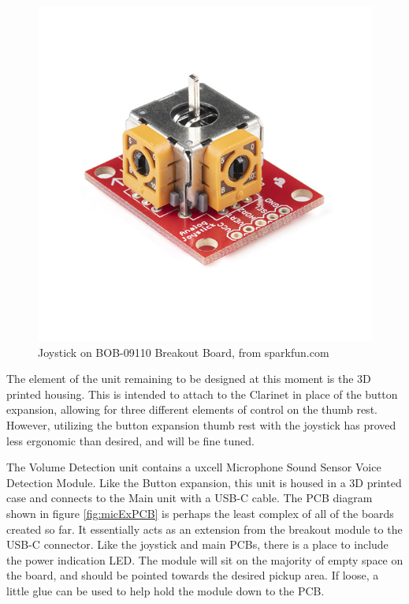 \begin{figure}
    \centering
    \includegraphics[scale=1.2]{diagrams/oem/16273-Thumb_Joystick_-_Deluxe-03.jpg}
    \caption{Joystick on BOB-09110 Breakout Board, from sparkfun.com}
    \label{fig:js2}
\end{figure}

The element of the unit remaining to be designed at this moment is the 3D printed housing. This is intended to attach to the Clarinet in place of the button expansion, allowing for three different elements of control on the thumb rest. However, utilizing the button expansion thumb rest with the joystick has proved less ergonomic than desired, and will be fine tuned.

The Volume Detection unit contains a uxcell Microphone Sound Sensor Voice Detection Module. Like the Button expansion, this unit is housed in a 3D printed case and connects to the Main unit with a USB-C cable. The PCB diagram shown in figure \ref{fig:micExPCB} is perhaps the least complex of all of the boards created so far. It essentially acts as an extension from the breakout module to the USB-C connector. Like the joystick and main PCBs, there is a place to include the power indication LED. The module will sit on the majority of empty space on the board, and should be pointed towards the desired pickup area. If loose, a little glue can be used to help hold the module down to the PCB. 

